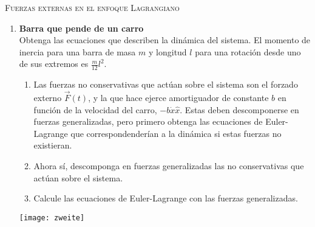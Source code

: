\documentclass[11pt, spanish, a4paper, twoside]{article}
\begin{document}
\begin{center}
  \textsc{\large Fuerzas externas en el enfoque Lagrangiano}
\end{center}

\begin{enumerate}

\item 
\begin{minipage}[t][8cm]{0.55\textwidth} 
\textbf{Barra que pende de un carro}\\
Obtenga las ecuaciones que describen la dinámica del sistema.
El momento de inercia para una barra de masa \(m\) y longitud \(l\) para una rotación desde uno de sus extremos es \(\frac{m}{12} l^2\). 
\begin{enumerate}
	\item Las fuerzas no conservativas que actúan sobre el sistema son el forzado externo \(\vec{F}(t)\), y la que hace ejerce amortiguador de constante \(b\) en función de la velocidad del carro,  \(- b \dot{x} \hat{x}\).
	Estas deben descomponerse en fuerzas generalizadas, pero primero obtenga las ecuaciones de Euler-Lagrange que correspondenderían a la dinámica si estas fuerzas no existieran.
	\item Ahora sí, descomponga en fuerzas generalizadas las no conservativas que actúan sobre el sistema.
	\item Calcule las ecuaciones de Euler-Lagrange con las fuerzas generalizadas.
\end{enumerate}
\end{minipage}
\begin{minipage}[c][-1cm][t]{0.4\textwidth}
	\texttt{[image: zweite]}
\end{minipage}




\end{enumerate}
\end{document}
